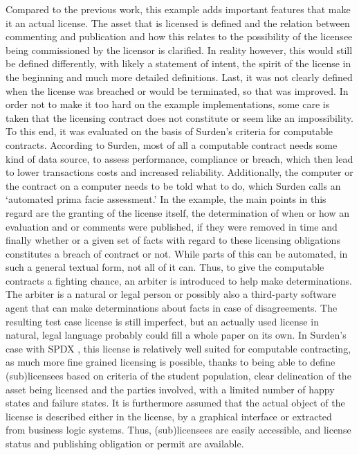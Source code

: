 \documentclass{article}
\begin{document}
Compared to the previous work, this example adds important features that make it an actual license. %
The asset that is licensed is defined and the relation between commenting and publication and how this relates to the possibility of the licensee being commissioned by the licensor is clarified.
In reality however, this would still be defined differently, with likely a statement of intent, the spirit of the license in the beginning and much more detailed definitions. Last, it was not clearly defined when the license was breached or would be terminated, so that was improved. %
In order not to make it too hard on the example implementations, some care is taken that the licensing contract does not constitute or seem like an impossibility. To this end, it was evaluated on the basis of Surden’s criteria for computable contracts. \cite{surdenArtificialIntelligenceLaw2019}
According to Surden, most of all a computable contract needs some kind of data source, to assess performance, compliance or breach, which then lead to lower transactions costs and increased reliability. Additionally, the computer or the contract on a computer needs to be told what to do, which Surden calls an ‘automated prima facie assessment.’  In the example, the main points in this regard are the granting of the license itself, the determination of when or how an evaluation and or comments were published, if they were removed in time and finally whether or a given set of facts with regard to these licensing obligations constitutes a breach of contract or not. While parts of this can be automated, in such a general textual form, not all of it can. Thus, to give the computable contracts a fighting chance, an arbiter is introduced to help make determinations. The arbiter is a natural or legal person or possibly also a third-party software agent that can make determinations about facts in case of disagreements. %
The resulting test case license is still %
imperfect, but an actually used license in natural, legal language probably could fill a whole paper on its own. In Surden’s case with SPDX \cite{odenceAdvancingSoftwarePackage2013}, this license is relatively well suited for computable contracting, as much more fine grained licensing is possible, thanks to being able to define (sub)licensees based on criteria of the student population, clear delineation of the asset being licensed and the parties involved, with a limited number of happy states and failure states.
It is furthermore assumed that the actual object of the license is described either in the license, by a graphical interface or extracted from business logic systems. Thus, (sub)licensees are easily accessible, and license status and publishing obligation or permit are available.
\end{document}
